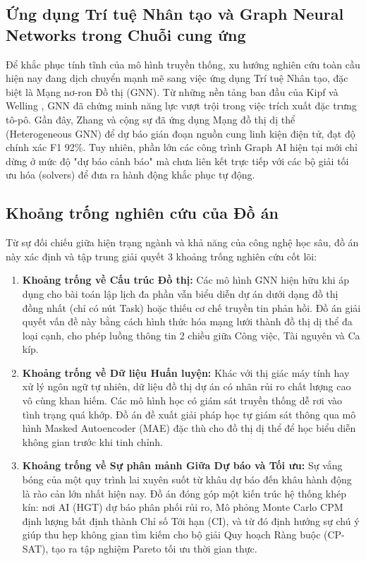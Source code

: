 \subsection{Ứng dụng Trí tuệ Nhân tạo và Graph Neural Networks trong Chuỗi cung ứng}
Để khắc phục tính tĩnh của mô hình truyền thống, xu hướng nghiên cứu toàn cầu hiện nay đang dịch chuyển mạnh mẽ sang việc ứng dụng Trí tuệ Nhân tạo, đặc biệt là Mạng nơ-ron Đồ thị (GNN). Từ những nền tảng ban đầu của Kipf và Welling \cite{kipf_2017_gcn}, GNN đã chứng minh năng lực vượt trội trong việc trích xuất đặc trưng tô-pô. Gần đây, Zhang và cộng sự \cite{zhang_2022_supply_chain} đã ứng dụng Mạng đồ thị dị thể (Heterogeneous GNN) để dự báo gián đoạn nguồn cung linh kiện điện tử, đạt độ chính xác F1 92\%. Tuy nhiên, phần lớn các công trình Graph AI hiện tại mới chỉ dừng ở mức độ "dự báo cảnh báo" mà chưa liên kết trực tiếp với các bộ giải tối ưu hóa (solvers) để đưa ra hành động khắc phục tự động.

\subsection{Khoảng trống nghiên cứu của Đồ án}
Từ sự đối chiếu giữa hiện trạng ngành và khả năng của công nghệ học sâu, đồ án này xác định và tập trung giải quyết 3 khoảng trống nghiên cứu cốt lõi:
\begin{enumerate}
    \item \textbf{Khoảng trống về Cấu trúc Đồ thị:} Các mô hình GNN hiện hữu khi áp dụng cho bài toán lập lịch đa phần vẫn biểu diễn dự án dưới dạng đồ thị đồng nhất (chỉ có nút Task) hoặc thiếu cơ chế truyền tin phản hồi. Đồ án giải quyết vấn đề này bằng cách hình thức hóa mạng lưới thành đồ thị dị thể đa loại cạnh, cho phép luồng thông tin 2 chiều giữa Công việc, Tài nguyên và Ca kíp.
    \item \textbf{Khoảng trống về Dữ liệu Huấn luyện:} Khác với thị giác máy tính hay xử lý ngôn ngữ tự nhiên, dữ liệu đồ thị dự án có nhãn rủi ro chất lượng cao vô cùng khan hiếm. Các mô hình học có giám sát truyền thống dễ rơi vào tình trạng quá khớp. Đồ án đề xuất giải pháp học tự giám sát thông qua mô hình Masked Autoencoder (MAE) đặc thù cho đồ thị dị thể để học biểu diễn không gian trước khi tinh chỉnh.
    \item \textbf{Khoảng trống về Sự phân mảnh Giữa Dự báo và Tối ưu:} Sự vắng bóng của một quy trình lai xuyên suốt từ khâu dự báo đến khâu hành động là rào cản lớn nhất hiện nay. Đồ án đóng góp một kiến trúc hệ thống khép kín: nơi AI (HGT) dự báo phân phối rủi ro, Mô phỏng Monte Carlo CPM định lượng bất định thành Chỉ số Tới hạn (CI), và từ đó định hướng sự chú ý giúp thu hẹp không gian tìm kiếm cho bộ giải Quy hoạch Ràng buộc (CP-SAT), tạo ra tập nghiệm Pareto tối ưu thời gian thực.
\end{enumerate}
